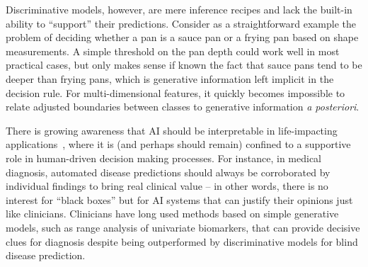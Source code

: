 \documentclass[english]{scrartcl}
\begin{document}

Discriminative models, however, are mere inference recipes and lack the built-in ability to ``support'' their predictions. Consider as a straightforward example the problem of deciding whether a pan is a sauce pan or a frying pan based on shape measurements. A simple threshold on the pan depth could work well in most practical cases, but only makes sense if known the fact that sauce pans tend to be deeper than frying pans, which is generative information left implicit in the decision rule. For multi-dimensional features, it quickly becomes impossible to relate adjusted boundaries between classes to generative information {\em a posteriori}.



There is growing awareness that AI should be interpretable in life-impacting applications~\cite{Molnar-18}, where it is (and perhaps should remain) confined to a supportive role in human-driven decision making processes. For instance, in medical diagnosis, automated disease predictions should always be corroborated by individual findings to bring real clinical value -- in other words, there is no interest for ``black boxes'' but for AI systems that can justify their opinions just like clinicians. Clinicians have long used methods based on simple generative models, such as range analysis of univariate biomarkers, that can provide decisive clues for diagnosis despite being outperformed by discriminative models for blind disease prediction.



\end{document}
